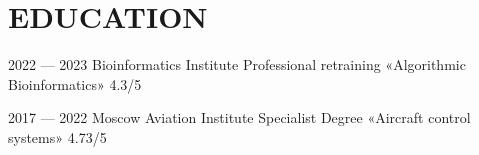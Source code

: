 \section{EDUCATION}

    \learn
    {2022 --- 2023}
    {Bioinformatics Institute}
    {Professional retraining}
    {«Algorithmic Bioinformatics»}
    {4.3/5}
    
    \learn
    {2017 — 2022}
    {Moscow Aviation Institute}
    {Specialist Degree}
    {«Aircraft control systems»}
    {4.73/5}
